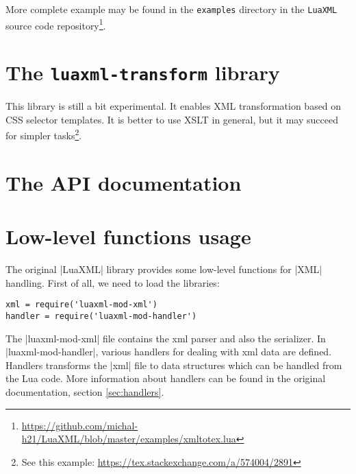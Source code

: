 \documentclass{ltxdoc}
\begin{document}
More complete example may be found in the \texttt{examples} directory in the
\texttt{LuaXML} source code
repository\footnote{\url{https://github.com/michal-h21/LuaXML/blob/master/examples/xmltotex.lua}}.

\section{The \texttt{luaxml-transform} library}

This library is still a bit experimental. It enables XML transformation based
on CSS selector templates. It is better to use XSLT in general, but it may
succeed for simpler tasks\footnote{See this example: \url{https://tex.stackexchange.com/a/574004/2891}}.



\section{The API documentation}




\section{Low-level functions usage}



The original |LuaXML| library provides some low-level functions for |XML| handling.
First of all, we need to load the libraries:

\begin{verbatim}
xml = require('luaxml-mod-xml')
handler = require('luaxml-mod-handler')
\end{verbatim} 


The |luaxml-mod-xml| file contains the  xml parser and also the serializer. In
|luaxml-mod-handler|, various handlers for dealing with xml data are defined.
Handlers transforms the |xml| file to data structures which can be handled from
the Lua code. More information about handlers can be found in the original
documentation, section \ref{sec:handlers}.
\end{document}
